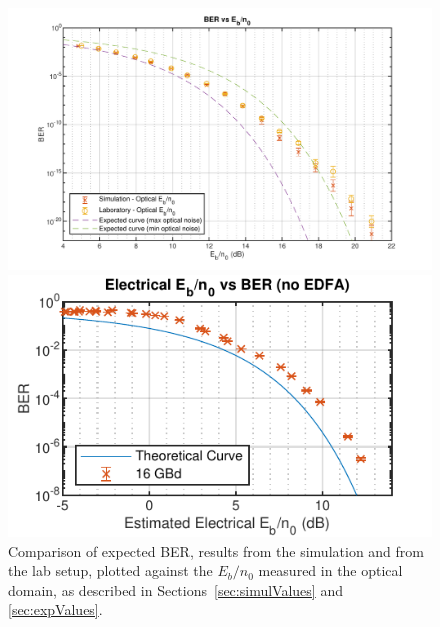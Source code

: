 	\begin{figure}[H]
		\centering
		\begin{minipage}{0.45\textwidth}
			\centering
			\includegraphics[width=1\textwidth]
			{./sdf/m_qam_system/figures/experimental/results/16GBd_noEDFA/ebn0Curve_sim16_final.pdf}
			\subcaption{\label{fig:16GBdBERH}}
		\end{minipage}
		\begin{minipage}{0.45\textwidth}
			\centering
			\includegraphics[width=1\textwidth]
			{./sdf/m_qam_system/figures/experimental/results/16GBd_noEDFA/ebn0Curve_lab16_noEDFA_181204.pdf}
			\subcaption{\label{fig:16GBdBERHnoEDFA}}
		\end{minipage}
		\caption{Comparison of expected BER, results from the simulation and from
			the lab setup, plotted against the $E_b/n_0$ measured in the optical
			domain, as described in Sections~\ref{sec:simulValues} and
		\ref{sec:expValues}.\label{fig:16expBerH}}
	\end{figure}

